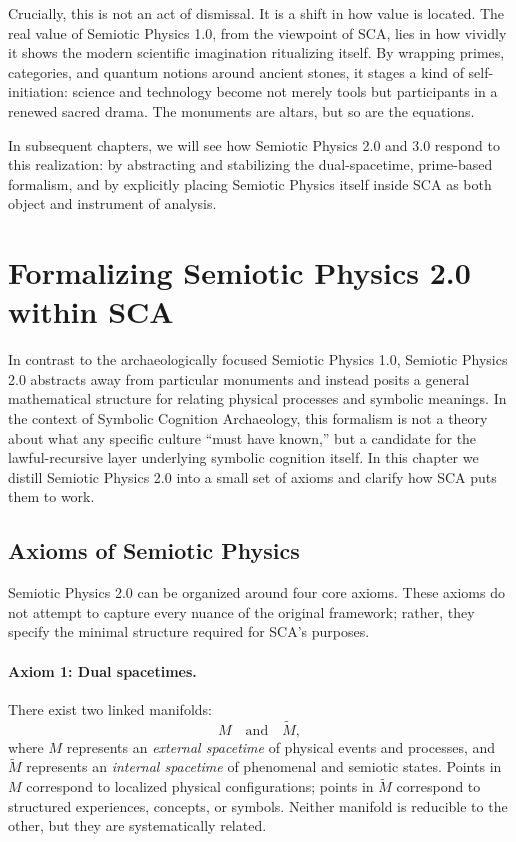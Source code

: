 \documentclass[12]{amsart}
\theoremstyle{plain}
\begin{document}
Crucially, this is not an act of dismissal. It is a shift in how value is located. The real value of Semiotic Physics 1.0, from the viewpoint of SCA, lies in how vividly it shows the modern scientific imagination ritualizing itself. By wrapping primes, categories, and quantum notions around ancient stones, it stages a kind of self-initiation: science and technology become not merely tools but participants in a renewed sacred drama. The monuments are altars, but so are the equations.

In subsequent chapters, we will see how Semiotic Physics 2.0 and 3.0 respond to this realization: by abstracting and stabilizing the dual-spacetime, prime-based formalism, and by explicitly placing Semiotic Physics itself inside SCA as both object and instrument of analysis.

\section{Formalizing Semiotic Physics 2.0 within SCA}

In contrast to the archaeologically focused Semiotic Physics 1.0, Semiotic Physics 2.0 abstracts away from particular monuments and instead posits a general mathematical structure for relating physical processes and symbolic meanings. In the context of Symbolic Cognition Archaeology, this formalism is not a theory about what any specific culture ``must have known,'' but a candidate for the lawful-recursive layer underlying symbolic cognition itself. In this chapter we distill Semiotic Physics 2.0 into a small set of axioms and clarify how SCA puts them to work.

\subsection{Axioms of Semiotic Physics}

Semiotic Physics 2.0 can be organized around four core axioms. These axioms do not attempt to capture every nuance of the original framework; rather, they specify the minimal structure required for SCA's purposes.

\paragraph{Axiom 1: Dual spacetimes.}

There exist two linked manifolds:
\[
  M \quad\text{and}\quad \tilde M,
\]
where $M$ represents an \emph{external spacetime} of physical events and processes, and $\tilde M$ represents an \emph{internal spacetime} of phenomenal and semiotic states. Points in $M$ correspond to localized physical configurations; points in $\tilde M$ correspond to structured experiences, concepts, or symbols. Neither manifold is reducible to the other, but they are systematically related.
\end{document}
